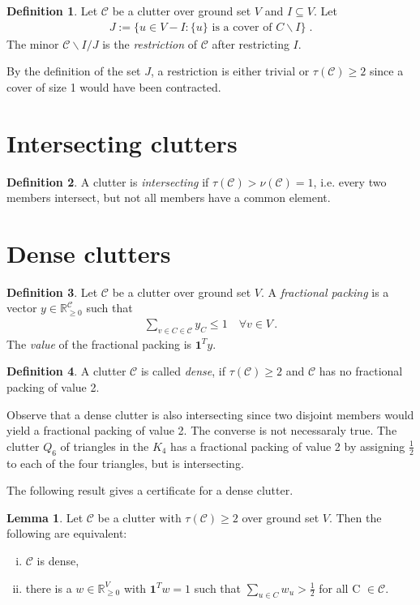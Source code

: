 \documentclass[a4paper, 12pt, twoside=false]{scrbook}
\theoremstyle{definition}
\newtheorem*{definition}{Definition}
\newtheorem{lemma}{Lemma}[chapter]
\newcommand*{\IR}{\ensuremath{\mathbb{R}}}
\begin{document}
\begin{definition}
    Let $\mathcal{C}$ be a clutter over ground set $V$ and $I \subseteq V$.
    Let
    \begin{align*}
        J := \{u \in V-I : \{u\} \text{ is a cover of } C\backslash I\} \;.
    \end{align*}
    The minor $\mathcal{C} \backslash I / J$ is the \emph{restriction} of $\mathcal{C}$ after restricting $I$.
\end{definition}

By the definition of the set $J$, a restriction is either trivial or $\tau(\mathcal{C}) \geq 2$ since a cover of size 1 would have been contracted.
\section{Intersecting clutters}
\begin{definition}
    A clutter is \emph{intersecting} if $\tau(\mathcal{C}) > \nu(\mathcal{C}) = 1$, i.e. every two members intersect, but not all members have a common element.
\end{definition}

\section{Dense clutters}
\begin{definition}
    Let $\mathcal{C}$ be a clutter over ground set $V$.
    A \emph{fractional packing} is a vector $y \in \IR_{\geq0}^{\mathcal{C}}$ such that
    \begin{align*}
        \sum_{v \in C \in \mathcal{C}} y_C \leq 1 \quad \forall v \in V \,.
    \end{align*}
    The \emph{value} of the fractional packing is $\textbf{1}^Ty$.
\end{definition}
\begin{definition}
    A clutter $\mathcal{C}$ is called \emph{dense}, if $\tau(\mathcal{C}) \geq 2$ and $\mathcal{C}$ has no fractional packing of value 2.
\end{definition}

Observe that a dense clutter is also intersecting since two disjoint members would yield a fractional packing of value 2.
The converse is not necessaraly true.
The clutter $Q_6$ of triangles in the $K_4$ has a fractional packing of value 2 by assigning $\frac 12$ to each of the four triangles, but is intersecting.

The following result gives a certificate for a dense clutter.
\begin{lemma}
    Let $\mathcal{C}$ be a clutter with $\tau(\mathcal{C})\geq 2$ over ground set $V$.
    Then the following are equivalent:
    \leavevmode
    \begin{enumerate}[(i)]
        \item $\mathcal{C}$ is dense,
        \item there is a $w \in \IR_{\geq 0}^V$ with $\textbf{1}^Tw=1$ such that $\sum_{u \in C} w_u > \frac 12$ for all C $\in \mathcal{C}$.
    \end{enumerate}
\end{lemma}
\end{document}
